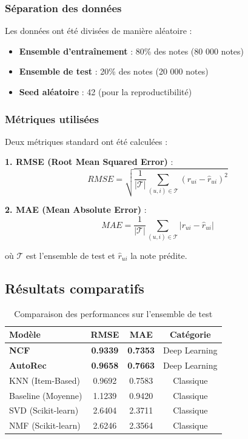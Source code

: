 \documentclass[12pt,a4paper]{article}
\begin{document}
\subsubsection{Séparation des données}

Les données ont été divisées de manière aléatoire :
\begin{itemize}
    \item \textbf{Ensemble d'entraînement} : 80\% des notes (80 000 notes)
    \item \textbf{Ensemble de test} : 20\% des notes (20 000 notes)
    \item \textbf{Seed aléatoire} : 42 (pour la reproductibilité)
\end{itemize}

\subsubsection{Métriques utilisées}

Deux métriques standard ont été calculées :

\textbf{1. RMSE (Root Mean Squared Error)} :
\begin{equation}
    RMSE = \sqrt{\frac{1}{|\mathcal{T}|} \sum_{(u,i) \in \mathcal{T}} (r_{ui} - \hat{r}_{ui})^2}
\end{equation}

\textbf{2. MAE (Mean Absolute Error)} :
\begin{equation}
    MAE = \frac{1}{|\mathcal{T}|} \sum_{(u,i) \in \mathcal{T}} |r_{ui} - \hat{r}_{ui}|
\end{equation}

où $\mathcal{T}$ est l'ensemble de test et $\hat{r}_{ui}$ la note prédite.

\subsection{Résultats comparatifs}

\begin{table}[H]
\centering
\begin{tabular}{@{}lccc@{}}
\toprule
\textbf{Modèle} & \textbf{RMSE} & \textbf{MAE} & \textbf{Catégorie} \\ \midrule
\textbf{NCF} & \textbf{0.9339} & \textbf{0.7353} & Deep Learning \\
\textbf{AutoRec} & \textbf{0.9658} & \textbf{0.7663} & Deep Learning \\
KNN (Item-Based) & 0.9692 & 0.7583 & Classique \\
Baseline (Moyenne) & 1.1239 & 0.9420 & Classique \\
SVD (Scikit-learn) & 2.6404 & 2.3711 & Classique \\
NMF (Scikit-learn) & 2.6246 & 2.3564 & Classique \\
\bottomrule
\end{tabular}
\caption{Comparaison des performances sur l'ensemble de test}
\label{tab:results}
\end{table}
\end{document}
